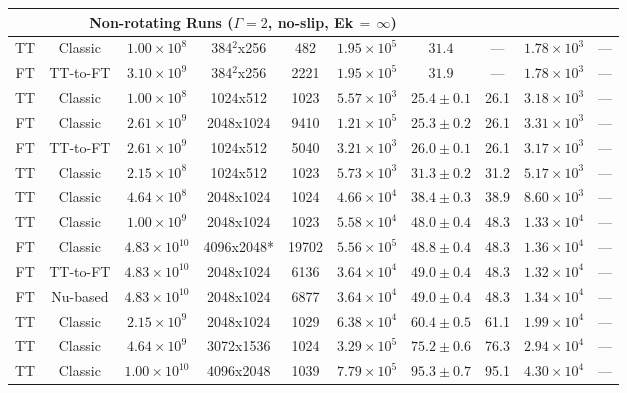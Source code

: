 \documentclass[aps, pre, onecolumn, nofootinbib, notitlepage, groupedaddress, amsfonts, amssymb, amsmath, longbibliography, superscriptaddress]{revtex4-1}
\begin{document}
\begin{table}[ht]
\begin{center}
{\begin{tabular}{c c c c c c c c c c}
\multicolumn{7}{c}{\vspace{0.1cm}Non-rotating Runs ($\Gamma = 2$, no-slip, Ek$\,=\,\infty$)} \\
\hline
TT			&	Classic		&	$1.00 \times 10^8$		&	384$^2$x256	&	482			&	$1.95 \times 10^5$	&	$31.4$			&	---		&	$1.78 \times 10^3$ & --- \\
FT			&	TT-to-FT	&	$3.10 \times 10^9$		&	384$^2$x256	&	2221		&	$1.95 \times 10^5$	&	$31.9$			&	---		&	$1.78 \times 10^3$ & --- \\
TT			&	Classic		&	$1.00 \times 10^8$		&	1024x512	&	1023		&	$5.57 \times 10^3$	&	$25.4 \pm 0.1$	&	26.1	&	$3.18 \times 10^3$ & --- \\
FT			&	Classic		&	$2.61 \times 10^9$		&	2048x1024	&	9410		&	$1.21 \times 10^5$	&	$25.3 \pm 0.2$	&	26.1	&	$3.31 \times 10^3$ & --- \\
FT			&	TT-to-FT	&	$2.61 \times 10^9$		&	1024x512	&	5040		&	$3.21 \times 10^3$	&	$26.0 \pm 0.1$	&	26.1	&	$3.17 \times 10^3$ & --- \\
TT			&	Classic		&	$2.15 \times 10^8$		&	1024x512	&	1023		&	$5.73 \times 10^3$	&	$31.3 \pm 0.2$	&	31.2	&	$5.17 \times 10^3$ & --- \\
TT			&	Classic		&	$4.64 \times 10^8$		&	2048x1024	&	1024		&	$4.66 \times 10^4$	&	$38.4 \pm 0.3$	&	38.9	&	$8.60 \times 10^3$ & --- \\
TT			&	Classic		&	$1.00 \times 10^9$		&	2048x1024	&	1023		&	$5.58 \times 10^4$	&	$48.0 \pm 0.4$	&	48.3	&	$1.33 \times 10^4$ & --- \\
FT			&	Classic		&	$4.83 \times 10^{10}$	&	4096x2048*	&	19702		&	$5.56 \times 10^5$	&	$48.8 \pm 0.4$	&	48.3	&	$1.36 \times 10^4$ & --- \\
FT			&	TT-to-FT	&	$4.83 \times 10^{10}$	&	2048x1024	&	6136		&	$3.64 \times 10^4$	&	$49.0 \pm 0.4$	&	48.3	&	$1.32 \times 10^4$ & --- \\
FT			&	Nu-based	&	$4.83 \times 10^{10}$	&	2048x1024	&	6877		&	$3.64 \times 10^4$	&	$49.0 \pm 0.4$	&	48.3	&	$1.34 \times 10^4$ & --- \\
TT			&	Classic		&	$2.15 \times 10^9$		&	2048x1024	&	1029		&	$6.38 \times 10^4$	&	$60.4 \pm 0.5$	&	61.1	&	$1.99 \times 10^4$ & --- \\
TT			&	Classic		&	$4.64 \times 10^9$		&	3072x1536	&	1024		&	$3.29 \times 10^5$	&	$75.2 \pm 0.6$	&	76.3	&	$2.94 \times 10^4$ & --- \\
TT			&	Classic		&	$1.00 \times 10^{10}$	&	4096x2048	&	1039		&	$7.79 \times 10^5$	&	$95.3 \pm 0.7$	&	95.1	&	$4.30 \times 10^4$ & --- \\

\end{tabular}}
\end{center}
\end{table}
\end{document}
